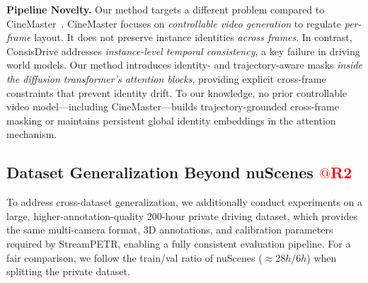 \textbf{Pipeline Novelty.}
Our method targets a different problem compared to CineMaster~\cite{wang2025cinemaster3dawarecontrollableframework}.  
CineMaster focuses on \emph{controllable video generation} to regulate \textit{per-frame} layout. 
It does not preserve instance identities \textit{across frames}.
In contrast, ConsisDrive addresses \emph{instance-level temporal consistency}, a key failure in driving world models. 
Our method introduces identity- and trajectory-aware masks \emph{inside the diffusion transformer’s attention blocks}, providing explicit cross-frame constraints that prevent identity drift. 
To our knowledge, no prior controllable video model—including CineMaster—builds trajectory-grounded cross-frame masking or maintains persistent global identity embeddings in the attention mechanism. 
























\subsection{Dataset Generalization Beyond nuScenes \textcolor{red}{$@$R2}}

To address cross-dataset generalization, we additionally conduct experiments on a large, higher-annotation-quality 200-hour private driving dataset,
which provides the same multi-camera format, 3D annotations, and calibration parameters required by StreamPETR, enabling a fully consistent evaluation pipeline.
For a fair comparison, we follow the train/val ratio of nuScenes ($\approx28h/6h$) when splitting the private dataset.


